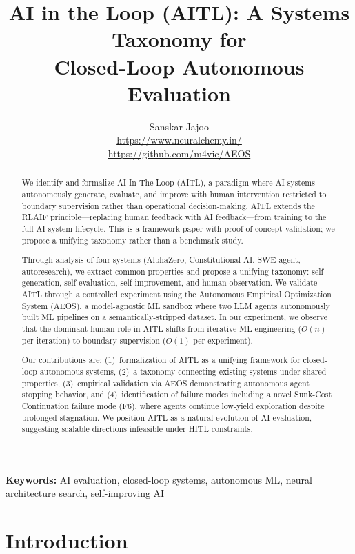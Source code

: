 \documentclass[11pt]{article}
\title{AI in the Loop (AITL): A Systems Taxonomy for\\Closed-Loop Autonomous Evaluation}
\author{
  Sanskar Jajoo\\
  \url{https://www.neuralchemy.in/}\\
  \url{https://github.com/m4vic/AEOS}
}
\date{}
\begin{document}
\maketitle

\begin{abstract}
We identify and formalize AI In The Loop (AITL), a paradigm where AI systems autonomously generate, evaluate, and improve with human intervention restricted to boundary supervision rather than operational decision-making. AITL extends the RLAIF principle---replacing human feedback with AI feedback---from training to the full AI system lifecycle. This is a framework paper with proof-of-concept validation; we propose a unifying taxonomy rather than a benchmark study.

Through analysis of four systems (AlphaZero, Constitutional AI, SWE-agent, autoresearch), we extract common properties and propose a unifying taxonomy: self-generation, self-evaluation, self-improvement, and human observation. We validate AITL through a controlled experiment using the Autonomous Empirical Optimization System (AEOS), a model-agnostic ML sandbox where two LLM agents autonomously built ML pipelines on a semantically-stripped dataset. In our experiment, we observe that the dominant human role in AITL shifts from iterative ML engineering ($O(n)$ per iteration) to boundary supervision ($O(1)$ per experiment).

Our contributions are: (1)~formalization of AITL as a unifying framework for closed-loop autonomous systems, (2)~a taxonomy connecting existing systems under shared properties, (3)~empirical validation via AEOS demonstrating autonomous agent stopping behavior, and (4)~identification of failure modes including a novel Sunk-Cost Continuation failure mode (F6), where agents continue low-yield exploration despite prolonged stagnation. We position AITL as a natural evolution of AI evaluation, suggesting scalable directions infeasible under HITL constraints.
\end{abstract}

\noindent\textbf{Keywords:} AI evaluation, closed-loop systems, autonomous ML, neural architecture search, self-improving AI

\section{Introduction}
\label{sec:intro}
\end{document}
